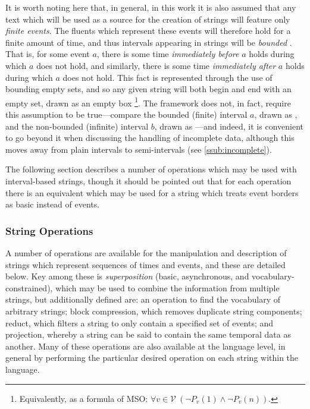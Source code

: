 \documentclass[a4paper,12pt,leqno,twoside]{article}
\newcommand{\vph}[1]{\vphantom{#1}}
\newcommand{\ebox}[1]{\fbox{$\vph{'(),}#1$}}
\newcommand{\V}{\mathcal{V}}
\newcommand{\EventString}[1]{%
	\renewcommand*{\do}[1]{\ebox{##1}}%
	\PipeParser{#1}%
}
\begin{document}
It is worth noting here that, in general, in this work it is also assumed that any text which will be used as a source for the creation of strings will feature only \textit{finite events}. The fluents which represent these events will therefore hold for a finite amount of time, and thus intervals appearing in strings will be \textit{bounded} \citep{allen1994actions}. That is, for some event $a$, there is some time \textit{immediately before} $a$ holds during which $a$ does not hold, and similarly, there is some time \textit{immediately after} $a$ holds during which $a$ does not hold. This fact is represented through the use of bounding empty sets, and so any given string will both begin and end with an empty set, drawn as an empty box \ebox{}\footnote{Equivalently, as a formula of MSO: $\forall v \in \V~ (\lnot P_v(1) \land \lnot P_v(n))$.}. The framework does not, in fact, require this assumption to be true---compare the bounded (finite) interval $a$, drawn as \EventString{{}|a|{}}, and the non-bounded (infinite) interval $b$, drawn as \EventString{b}---and indeed, it is convenient to go beyond it when discussing the handling of incomplete data, although this moves away from plain intervals to semi-intervals (see \cref{ssub:incomplete}).

The following section describes a number of operations which may be used with interval-based strings, though it should be pointed out that for each operation there is an equivalent which may be used for a string which treats event borders as basic instead of events.

\subsubsection{String Operations}\label{ssub:operations}
A number of operations are available for the manipulation and description of strings which represent sequences of times and events, and these are detailed below. Key among these is \textit{superposition} (basic, asynchronous, and vocabulary-constrained), which may be used to combine the information from multiple strings, but additionally defined are: an operation to find the vocabulary of arbitrary strings; block compression, which removes duplicate string components; reduct, which filters a string to only contain a specified set of events; and projection, whereby a string can be said to contain the same temporal data as another. Many of these operations are also available at the language level, in general by performing the particular desired operation on each string within the language.
\end{document}
